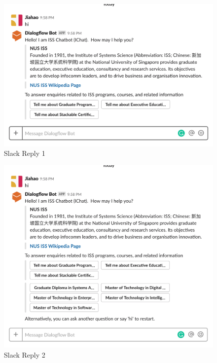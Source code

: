 		\begin{figure}[h]
			\centering
			\includegraphics[width=\linewidth/2, frame]{img/slack_1.png}
			\caption{Slack Reply 1}
			\label{fig:slack_reply_1}
		\end{figure}

		\begin{figure}[h]
			\centering
			\includegraphics[width=\linewidth/2, frame]{img/slack_2.png}
			\caption{Slack Reply 2}
			\label{fig:slack_reply_2}
		\end{figure}


